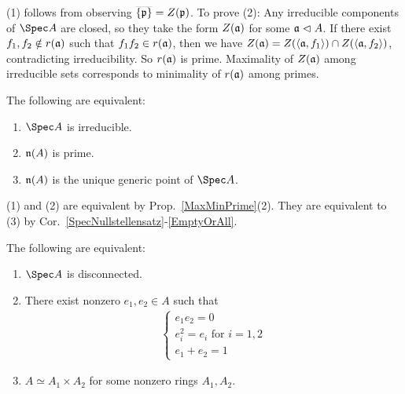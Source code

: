 \documentclass[10pt,final,oneside]{amsbook}
\makeatletter
\renewenvironment{proof}[1][\proofname] 
{ 	
	\par\pushQED{\qed}\normalfont\topsep6\p@\@plus6\p@\relax\trivlist\itemindent\normalparindent
	\item[\hskip\labelsep\itshape#1\@addpunct{.}]\ignorespaces
}
{
	\popQED\endtrivlist\@endpefalse
}
\numberwithin{equation}{section}
\makeatother
\begin{document}
\begin{proof}
(1) follows from observing $\smash{\smash{\overline{\{\mathfrak{p}\}}}} = Z(\mathfrak{p})$.
To prove (2):
Any irreducible components of $\Spec A$ are closed, so they take the form $Z(\mathfrak{a})$ for some $\mathfrak{a} \vartriangleleft A$.
If there exist $f_1, f_2 \notin r(\mathfrak{a})$ such that $f_1f_2 \in r(\mathfrak{a})$, then we have $Z(\mathfrak{a}) = Z({\langle{\mathfrak{a}, f_1}\rangle}) \cap Z({\langle{\mathfrak{a}, f_2}\rangle})$, contradicting irreducibility.
So $r(\mathfrak{a})$ is prime.
Maximality of $Z(\mathfrak{a})$ among irreducible sets corresponds to minimality of $r(\mathfrak{a})$ among primes.
\end{proof}

\begin{cor}\label{2.1.7}
The following are equivalent:
\begin{enumerate}
\item 	$\Spec A$ is irreducible.
\item 	$\mathfrak{n}(A)$ is prime.
\item	$\mathfrak{n}(A)$ is the unique generic point of $\Spec A$.
\end{enumerate}
\end{cor}

\begin{proof}
(1) and (2) are equivalent by Prop.~\ref{MaxMinPrime}(2).
They are equivalent to (3) by Cor.~\ref{SpecNullstellensatz}-\ref{EmptyOrAll}.
\end{proof}

\begin{prop}\label{Disconnected}
The following are equivalent:
\begin{enumerate}
\item 	$\Spec A$ is disconnected.
\item 	There exist nonzero $e_1, e_2 \in A$ such that 
			\begin{align}
			\left\{\begin{array}{ll}
			e_1e_2		= 	0\\
			e_i^2			= 	\text{$e_i$ for $i = 1,2$}\\
			e_1 + e_2	= 	1
			\end{array}\right.
			\end{align}
\item 	$A \simeq A_1 \times A_2$ for some nonzero rings $A_1, A_2$.
\end{enumerate}
\end{prop}
\end{document}
